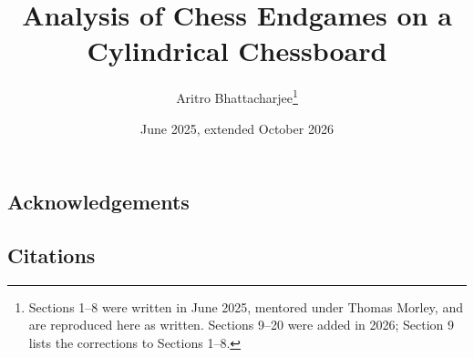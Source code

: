 \documentclass{article}
\title{Analysis of Chess Endgames on a Cylindrical Chessboard}
\author{Aritro Bhattacharjee\thanks{Sections 1--8 were written in June 2025, mentored under Thomas Morley,
and are reproduced here as written. Sections 9--20 were added in 2026; Section 9 lists the corrections to
Sections 1--8.}}
\date{June 2025, extended October 2026}
\begin{document}
\maketitle



\newpage













\newpage
\begin{center}
\section*{Acknowledgements}
\end{center}


\newpage
\begin{center}
\section*{Citations}
\end{center}

\end{document}
